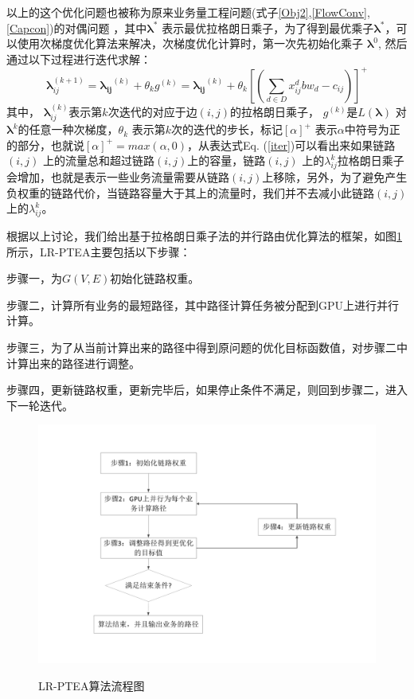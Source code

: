 以上的这个优化问题也被称为原来业务量工程问题(式子\ref{Obj2},\ref{FlowConv},\ref{Capcon})的对偶问题 ，其中$\mathbf{\lambda^*}$ 表示最优拉格朗日乘子，为了得到最优乘子$\mathbf{\lambda^*}$，可以使用次梯度优化算法来解决，次梯度优化计算时，第一次先初始化乘子 $\mathbf{\lambda}^0$, 然后通过以下过程进行迭代求解：
\begin{equation}\label{iter}
\mathbf{\lambda}_{ij}^{(k+1)} =\mathbf{\lambda_{ij}}^{(k)}+\theta_{k} g^{(k)}= \mathbf{\lambda_{ij}}^{(k)} + \theta_k[(\sum\limits_{d \in D}x_{ij}^d bw_d- c_{ij})]^+
\end{equation}
其中， $\mathbf{\lambda}_{ij}^{(k)}$表示第$k$次迭代的对应于边$(i,j)$的拉格朗日乘子， $g^{(k)}$是$L(\mathbf{\lambda})$ 对$\mathbf{\lambda}^{k}$的任意一种次梯度，$\theta_k$ 表示第$k$次的迭代的步长，标记$[\alpha]^+$ 表示$\alpha$中符号为正的部分，也就说$[\alpha]^+=max(\alpha, 0)$，从表达式Eq. (\ref{iter})可以看出来如果链路$(i,j)$ 上的流量总和超过链路$(i,j)$上的容量，链路$(i,j)$ 上的$\lambda_{ij}^k$拉格朗日乘子会增加，也就是表示一些业务流量需要从链路$(i,j)$上移除，另外，为了避免产生负权重的链路代价，当链路容量大于其上的流量时，我们并不去减小此链路$(i,j)$上的$\lambda_{ij}^k$。

根据以上讨论，我们给出基于拉格朗日乘子法的并行路由优化算法的框架，如图\ref{lpl}所示，LR-PTEA主要包括以下步骤：

步骤一，为$G(V, E)$初始化链路权重。

步骤二，计算所有业务的最短路径，其中路径计算任务被分配到GPU上进行并行计算。

步骤三，为了从当前计算出来的路径中得到原问题的优化目标函数值，对步骤二中计算出来的路径进行调整。

步骤四，更新链路权重，更新完毕后，如果停止条件不满足，则回到步骤二，进入下一轮迭代。
\begin{figure}
\vspace{-1cm}
\setlength{\abovecaptionskip}{-0.5cm}
\begin{center}
{\includegraphics[width=1\textwidth]{figures/lagrange.pdf}}
\end{center}
\caption{{\footnotesize{LR-PTEA算法流程图}}}
\label{lpl}
\end{figure}
